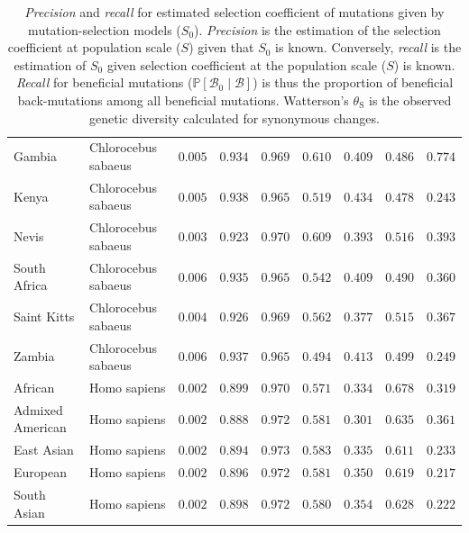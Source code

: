 \documentclass[12pt]{article}
\newcommand{\proba}{\mathbb{P}}
\newcommand{\Sphy}{S_{0}}
\newcommand{\SphyBen}{\mathcal{B}_0}
\newcommand{\given}{\mid}
\newcommand{\Spop}{S}
\newcommand{\SpopBen}{\mathcal{B}}
\newcommand{\thetaSyn}{\theta_{\text{S}}}
\begin{document}
\begin{table}[tb]
\begin{adjustbox}{width=\textwidth}
\begin{tabular}{||l|l|r||r|r||r|r||r|r||}
            \rowcolor{LIGHTGREY} Gambia             & Chlorocebus sabaeus & $ 0.005$ & $ 0.934$ & $ 0.969$ & $ 0.610$ & $ 0.409$ & $ 0.486$ & $ 0.774$ \\
            \rowcolor{LIGHTGREY} Kenya                                 & Chlorocebus sabaeus        & $ 0.005$ & $ 0.938$ & $ 0.965$ & $ 0.519$ & $ 0.434$ & $ 0.478$ & $ 0.243$ \\
            \rowcolor{LIGHTGREY} Nevis                        & Chlorocebus sabaeus        & $ 0.003$ & $ 0.923$ & $ 0.970$ & $ 0.609$ & $ 0.393$ & $ 0.516$ & $ 0.393$ \\
            \rowcolor{LIGHTGREY} South Africa                              & Chlorocebus sabaeus        & $ 0.006$ & $ 0.935$ & $ 0.965$ & $ 0.542$ & $ 0.409$ & $ 0.490$ & $ 0.360$ \\
            \rowcolor{LIGHTGREY} Saint Kitts                                & Chlorocebus sabaeus        & $ 0.004$ & $ 0.926$ & $ 0.969$ & $ 0.562$ & $ 0.377$ & $ 0.515$ & $ 0.367$ \\
            \rowcolor{LIGHTGREY} Zambia                             & Chlorocebus sabaeus        & $ 0.006$ & $ 0.937$ & $ 0.965$ & $ 0.494$ & $ 0.413$ & $ 0.499$ & $ 0.249$ \\
            African                             & Homo sapiens        & $ 0.002$ & $ 0.899$ & $ 0.970$ & $ 0.571$ & $ 0.334$ & $ 0.678$ & $ 0.319$ \\
            Admixed American                             & Homo sapiens        & $ 0.002$ & $ 0.888$ & $ 0.972$ & $ 0.581$ & $ 0.301$ & $ 0.635$ & $ 0.361$ \\
            East Asian                             & Homo sapiens        & $ 0.002$ & $ 0.894$ & $ 0.973$ & $ 0.583$ & $ 0.335$ & $ 0.611$ & $ 0.233$ \\
            European                             & Homo sapiens        & $ 0.002$ & $ 0.896$ & $ 0.972$ & $ 0.581$ & $ 0.350$ & $ 0.619$ & $ 0.217$ \\
            South Asian                             & Homo sapiens        & $ 0.002$ & $ 0.898$ & $ 0.972$ & $ 0.580$ & $ 0.354$ & $ 0.628$ & $ 0.222$ \\
            \bottomrule
        \end{tabular}
    \end{adjustbox}
    \caption{
        \textit{Precision} and \textit{recall} for estimated selection coefficient of mutations given by mutation-selection models ($\Sphy$).
        \textit{Precision} is the estimation of the selection coefficient at population scale ($\Spop$) given that $\Sphy$ is known.
        Conversely, \textit{recall} is the estimation of $\Sphy$ given selection coefficient at the population scale ($\Spop$) is known.
        \textit{Recall} for beneficial mutations ($\proba [\SphyBen \given \SpopBen]$) is thus the proportion of beneficial back-mutations among all beneficial mutations.
        Watterson's $\thetaSyn$ is the observed genetic diversity calculated for synonymous changes.
    }
    \label{table:proba}
\end{table}
\end{document}
